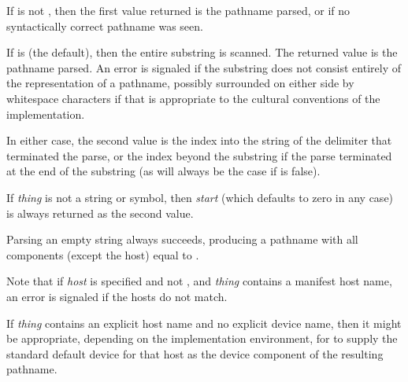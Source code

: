 \begin{defun}[Function]
If  is not {\false}, then the first value
returned is the pathname parsed, or {\false} if no syntactically correct
pathname was seen.

If  is {\false} (the default),
then the entire substring is scanned.
The returned value is the pathname parsed.
An error is signaled if the substring does not consist entirely of
the representation of a pathname, possibly surrounded on either side by
whitespace characters if that is appropriate to the cultural conventions
of the implementation.

In either case, the second value is the index into the string of the delimiter
that terminated the parse, or the index beyond the substring if the
parse terminated at the end of the substring (as will always be the case if
 is false).

If \emph{thing} is not a string or symbol, then \emph{start} (which defaults
to zero in any case) is always returned as the second value.

Parsing an empty string always succeeds, producing a pathname with
all components (except the host) equal to {\nil}.

Note that if \emph{host} is specified and not {\nil},
and \emph{thing} contains a manifest host name, an
error is signaled if the hosts do not match.

If \emph{thing} contains an explicit host name and no explicit device name,
then it might be appropriate, depending on the
implementation environment, for  to supply the
standard default device for that host as the device component
of the resulting pathname.
\end{defun}


